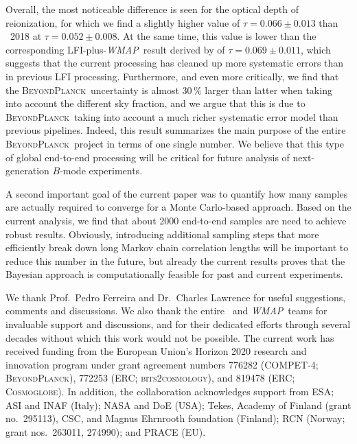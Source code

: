 \documentclass[twocolumn]{aa}
\def\WMAP{\textit{WMAP}}
\newcommand{\BP}{\textsc{BeyondPlanck}}
\begin{document}
Overall, the most noticeable difference is seen for the optical depth
of reionization, for which we find a slightly higher value of
$\tau=0.066\pm0.013$ than \Planck\ 2018 at $\tau=0.052\pm0.008$. At
the same time, this value is lower than the corresponding
LFI-plus-\WMAP\ result derived by \citet{natale:2020} of
$\tau=0.069\pm0.011$, which suggests that the current processing has
cleaned up more systematic errors than in previous LFI
processing. Furthermore, and even more critically, we find that the
\BP\ uncertainty is almost 30\,\% larger than latter when taking into
account the different sky fraction, and we argue that this is
due to \BP\ taking into account a much richer systematic error model
than previous pipelines. Indeed, this result summarizes the main
purpose of the entire \BP\ project in terms of one single number. We
believe that this type of global end-to-end processing will be
critical for future analysis of next-generation $B$-mode experiments.

A second important goal of the current paper was to quantify how many
samples are actually required to converge for a Monte Carlo-based
approach. Based on the current analysis, we find that about 2000
end-to-end samples are need to achieve robust results. Obviously,
introducing additional sampling steps that more efficiently break down
long Markov chain correlation lengths will be important to reduce this
number in the future, but already the current results proves that the
Bayesian approach is computationally feasible for past and current
experiments. 

\begin{acknowledgements}
  We thank Prof.\ Pedro Ferreira and Dr.\ Charles Lawrence for useful suggestions, comments and 
  discussions. We also thank the entire \Planck\ and \WMAP\ teams for
  invaluable support and discussions, and for their dedicated efforts
  through several decades without which this work would not be
  possible. The current work has received funding from the European
  Union’s Horizon 2020 research and innovation program under grant
  agreement numbers 776282 (COMPET-4; \BP), 772253 (ERC;
  \textsc{bits2cosmology}), and 819478 (ERC; \textsc{Cosmoglobe}). In
  addition, the collaboration acknowledges support from ESA; ASI and
  INAF (Italy); NASA and DoE (USA); Tekes, Academy of Finland (grant
   no.\ 295113), CSC, and Magnus Ehrnrooth foundation (Finland); RCN
  (Norway; grant nos.\ 263011, 274990); and PRACE (EU).
\end{acknowledgements}





\raggedright
\end{document}
